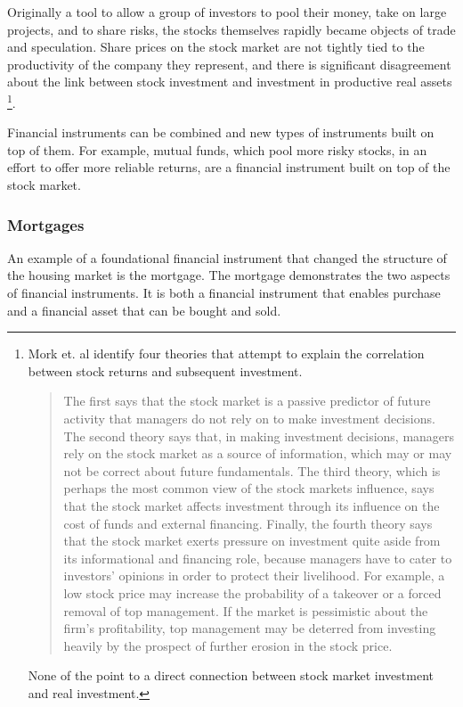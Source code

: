 Originally a tool to allow a group of investors to pool their money, take on large projects, and to share risks, the stocks themselves rapidly became objects of trade and speculation. Share prices on the stock market are not tightly tied to the productivity of the company they represent, %
and there is significant disagreement about the link between stock investment and investment in productive real assets \footnote{Mork et. al \cite{morckStockMarketInvestment1990} identify four theories that attempt to explain the correlation between stock returns and subsequent investment. \begin{quotation}The first says that the stock market is a passive predictor of future activity that managers do not rely on to make investment decisions. The second theory says that, in making investment decisions, managers rely on the stock market as a source of information, which may or may not be correct about future fundamentals. The third theory, which is perhaps the most common view of the stock markets influence, says that the stock market affects investment through its influence on the cost of funds and external financing. Finally, the fourth theory says that the stock market exerts pressure on investment quite aside from its informational and financing role, because managers have to cater to investors' opinions in order to protect their livelihood. For example, a low stock price may increase the probability of a takeover or a forced removal of top management. If the market is pessimistic about the firm's profitability, top management may be deterred from investing heavily by the prospect of further erosion in the stock price.\end{quotation} None of the point to a direct connection between stock market investment and real investment.}. 

Financial instruments can be combined and new types of instruments built on top of them. For example,
mutual funds, which pool more risky stocks, in an effort to offer more reliable returns, are a financial instrument built on top of the stock market.

\subsubsection{Mortgages}
An example of a foundational financial instrument that changed the structure of the housing market is the mortgage.  The mortgage demonstrates the two aspects of financial instruments. It is both a financial instrument that enables  purchase and a financial asset that can be bought and sold. 

